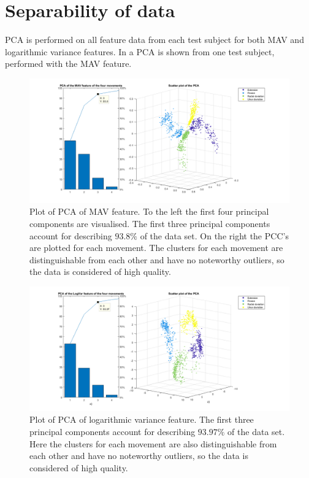 \section{Separability of data}

PCA is performed on all feature data from each test subject for both MAV and logarithmic variance features. In  a PCA is shown from one test subject, performed with the MAV feature. 

\begin{figure}[H]
	\includegraphics[height=0.2\textheight,width=1.1\textwidth]{figures/results/pcasubplotMAV.png} 
	\caption{Plot of PCA of MAV feature. To the left the first four principal components are visualised. The first three principal components account for describing $93.8\%$ of the data set. On the right the PCC's are plotted for each movement. The clusters for each movement are distinguishable from each other and have no noteworthy outliers, so the data is considered of high quality.} 
	\label{fig:pcasubplotMAV}
\end{figure} 

\begin{figure}[H]
	\includegraphics[height=0.2\textheight,width=1.1\textwidth]{figures/results/pcasubplotLogVar.png} 
	\caption{Plot of PCA of logarithmic variance feature. The first three principal components account for describing $93.97\%$ of the data set. Here the clusters for each movement are also distinguishable from each other and have no noteworthy outliers, so the data is considered of high quality.} 
	\label{fig:pcasubplotLogVar}
\end{figure}

